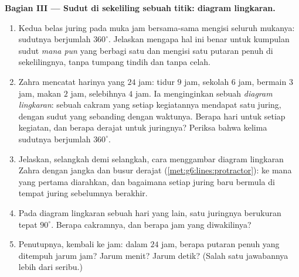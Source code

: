 \begin{problem}
\medskip
\noindent\textbf{Bagian III --- Sudut di sekeliling sebuah titik:
diagram lingkaran.}
\begin{enumerate}[resume]
  \item Kedua belas juring pada muka jam bersama-sama mengisi seluruh
        mukanya: sudutnya berjumlah $360^\circ$. Jelaskan mengapa hal
        ini benar untuk kumpulan sudut \emph{mana pun} yang berbagi
        satu  dan mengisi satu putaran penuh di
        sekelilingnya, tanpa tumpang tindih dan tanpa celah.
  \item Zahra mencatat harinya yang $24$ jam: tidur $9$ jam, sekolah
        $6$ jam, bermain $3$ jam, makan $2$ jam, selebihnya $4$ jam.
        Ia menginginkan sebuah \emph{diagram lingkaran}: sebuah cakram
        yang setiap kegiatannya mendapat satu juring, dengan sudut
        yang sebanding dengan waktunya. Berapa  hari untuk
        setiap kegiatan, dan berapa derajat untuk juringnya? Periksa
        bahwa kelima sudutnya berjumlah $360^\circ$.
  \item Jelaskan, selangkah demi selangkah, cara menggambar diagram
        lingkaran Zahra dengan jangka dan busur derajat
        (\cref{met:g6:lines:protractor}): ke mana  yang
        pertama diarahkan, dan bagaimana setiap juring baru bermula di
        tempat juring sebelumnya berakhir.
  \item Pada diagram lingkaran sebuah hari yang lain, satu juringnya
        berukuran tepat $90^\circ$. Berapa  cakramnya, dan
        berapa jam yang diwakilinya?
  \item Penutupnya, kembali ke jam: dalam $24$ jam, berapa putaran
        penuh yang ditempuh jarum jam? Jarum menit? Jarum detik?
        (Salah satu jawabannya lebih dari seribu.)

\end{enumerate}
\end{problem}
